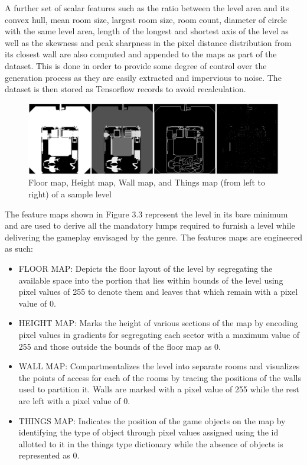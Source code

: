 \documentclass{Configuration_Files/PoliMi3i_thesis}
\begin{document}
A further set of scalar features such as the ratio between the level area and its convex 
hull, mean room size, largest room size, room count, diameter of circle with the same 
level area, length of the longest and shortest axis of the level as well as the skewness 
and peak sharpness in the pixel distance distribution from its closest wall are also 
computed and appended to the maps as part of the dataset. This is done in order to 
provide some degree of control over the generation process as they are easily 
extracted and impervious to noise. The dataset is then stored as Tensorflow records 
to avoid recalculation.
\begin{figure}[H]
    \centering
    \includegraphics[width=1\textwidth]{old_feature_maps.jpg}
    \caption[Feature maps of a sample level]{Floor map, Height map, Wall map, and Things map (from left to right) of a 
sample level}
    \label{fig:oldfeaturemaps}
\end{figure}
The feature maps shown in Figure 3.3 represent the level in its bare minimum and 
are used to derive all the mandatory lumps required to furnish a level while 
delivering the gameplay envisaged by the genre. The features maps are engineered
as such:
\begin{itemize}
\item FLOOR MAP: Depicts the floor layout of the level by segregating the 
available space into the portion that lies within bounds of the level using pixel 
values of 255 to denote them and leaves that which remain with a pixel value 
of 0.
\item HEIGHT MAP: Marks the height of various sections of the map by encoding 
pixel values in gradients for segregating each sector with a maximum value of 
255 and those outside the bounds of the floor map as 0.
\item WALL MAP: Compartmentalizes the level into separate rooms and visualizes 
the points of access for each of the rooms by tracing the positions of the walls 
used to partition it. Walls are marked with a pixel value of 255 while the rest 
are left with a pixel value of 0.
\item THINGS MAP: Indicates the position of the game objects on the map by 
identifying the type of object through pixel values assigned using the id 
allotted to it in the things type dictionary while the absence of objects is 
represented as 0.
\end{itemize}
\newpage
\end{document}
